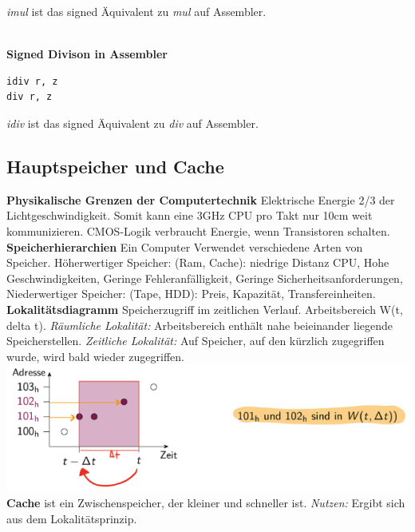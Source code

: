 \documentclass[7pt,landscape,a4paper]{scrartcl}
\begin{document}
\begin{multicols*}{4}
\begin{minipage}[b]{0,8\linewidth}
\textit{imul} ist das signed Äquivalent zu \textit{mul} auf Assembler.
\end{minipage}\\
\textbf{Signed Divison in Assembler}\\
\begin{minipage}[b]{0,2\linewidth}
\begin{verbatim}
idiv r, z 
div r, z 
\end{verbatim}
\end{minipage}
\begin{minipage}[b]{0,8\linewidth}
\textit{idiv} ist das signed Äquivalent zu \textit{div} auf Assembler.
\end{minipage}

\subsection{Hauptspeicher und Cache}
\vspace{-0.75em}
\textbf{Physikalische Grenzen der Computertechnik} Elektrische Energie 2/3 der Lichtgeschwindigkeit. Somit kann eine 3GHz CPU pro Takt nur 10cm weit kommunizieren. CMOS-Logik verbraucht Energie, wenn Transistoren schalten.\\
\textbf{Speicherhierarchien} Ein Computer Verwendet verschiedene Arten von Speicher. Höherwertiger Speicher: (Ram, Cache): niedrige Distanz CPU, Hohe Geschwindigkeiten, Geringe Fehleranfälligkeit, Geringe Sicherheitsanforderungen, Niederwertiger Speicher: (Tape, HDD): Preis, Kapazität, Transfereinheiten.\\
\textbf{Lokalitätsdiagramm} Speicherzugriff im zeitlichen Verlauf. Arbeitsbereich W(t, delta t). \textit{Räumliche Lokalität:} Arbeitsbereich enthält nahe beieinander liegende Speicherstellen. \textit{Zeitliche Lokalität:} Auf Speicher, auf den kürzlich zugegriffen wurde, wird bald wieder zugegriffen.\\
\includegraphics[width=\linewidth]{arbeitsbereich}\\
\textbf{Cache} ist ein Zwischenspeicher, der kleiner und schneller ist. \textit{Nutzen:} Ergibt sich aus dem Lokalitätsprinzip. \\

\end{multicols*}
\end{document}
